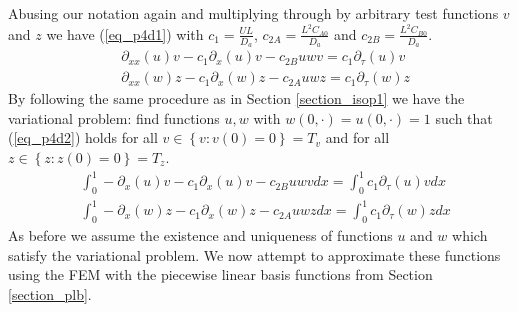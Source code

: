 \documentclass[11pt,fleqn]{article}
\theoremstyle{defstyle}
\begin{document}
Abusing our notation again and multiplying through by arbitrary test functions $v$ and $z$ we have (\ref{eq_p4d1}) with $c_1 = \frac{UL}{D_a}$,  $c_{2A} = \frac{L^2C_{A0}}{D_a}$ and  $c_{2B} = \frac{L^2C_{B0}}{D_a}$.
\begin{equation}
\begin{aligned}
&\partial_{xx}(u)v - c_1\partial_x(u)v - c_{2B}uwv = c_1\partial_\tau(u)v \\
&\partial_{xx}(w)z - c_1\partial_x(w)z - c_{2A}uwz = c_1\partial_\tau(w)z 
\end{aligned}
\label{eq_p4d1}
\end{equation}
By following the same procedure as in Section \ref{section_isop1} we have the variational problem: find functions $u, w$ with $w(0,\cdot)=u(0,\cdot)=1$ such that (\ref{eq_p4d2}) holds for all $v \in \left\{v : v(0) = 0 \right\} = T_v$ and for all $z \in \left\{z : z(0) = 0 \right\} = T_z$.
\begin{equation}
\begin{aligned}
&\int_0^1 -\partial_{x}(u)v - c_1\partial_x(u)v - c_{2B}uwvdx = \int_0^1 c_1\partial_\tau(u)v dx \\
&\int_0^1-\partial_{x}(w)z - c_1\partial_x(w)z - c_{2A}uwzdx = \int_0^1 c_1\partial_\tau(w)zdx 
\end{aligned}
\label{eq_p4d2}
\end{equation}
As before we assume the existence and uniqueness of functions $u$ and $w$ which satisfy the variational problem. We now attempt to approximate these functions using the FEM with the piecewise linear basis functions from Section \ref{section_plb}. 
\end{document}
